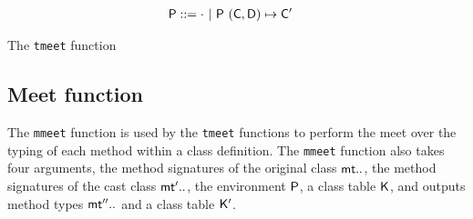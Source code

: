 \documentclass[sigconf]{acmart}
\begin{document}
\begin{align*}
\P &::= \cdot \B \P ~{{(\C,\D)}\mapsto\Cp}
\end{align*}
\begin{mathpar}




\end{mathpar}
{The \texttt{tmeet} function}

\subsection{Meet function}\label{monmeet}

The \texttt{mmeet} function is used by the \texttt{tmeet} functions to
perform the meet over the typing of each method within a class definition.
The \texttt{mmeet} function also takes four arguments, the method
signatures of the original class $\mt..$, the method signatures of the cast
class $\mtp..$, the environment $\P$, a class table $\K$, and outputs method
types $\mtpp..$ and a class table $\Kp$. \\

\hrulefill
\begin{mathpar}


\end{mathpar}
\end{document}
